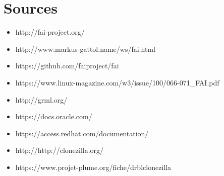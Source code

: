 \documentclass[a4paper,12pt,one side,titlepage]{report}
\begin{document}
\chapter{Sources}
\begin{itemize}
  \item http://fai-project.org/\\
  \item http://www.markus-gattol.name/ws/fai.html\\
  \item https://github.com/faiproject/fai\\
  \item https://www.linux-magazine.com/w3/issue/100/066-071\_FAI.pdf\\
  \item http://grml.org/\\
  \item https://docs.oracle.com/\\
  \item https://access.redhat.com/documentation/\\
  \item http://http://clonezilla.org/\\
  \item https://www.projet-plume.org/fiche/drblclonezilla\\
\end{itemize}
\end{document}

